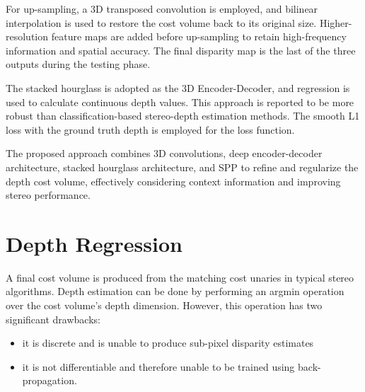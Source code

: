 \documentclass[english, LaM, oneside]{sapthesis}%
\begin{document}
For up-sampling, a 3D transposed convolution is employed, and bilinear interpolation is used to restore the cost volume back to its original size. Higher-resolution feature maps are added before up-sampling to retain high-frequency information and spatial accuracy. The final disparity map is the last of the three outputs during the testing phase.

The stacked hourglass is adopted as the 3D Encoder-Decoder, and regression is used to calculate continuous depth values. This approach is reported to be more robust than classification-based stereo-depth estimation methods. The smooth L1 loss with the ground truth depth is employed for the loss function.

The proposed approach combines 3D convolutions, deep encoder-decoder architecture, stacked hourglass architecture, and SPP to refine and regularize the depth cost volume, effectively considering context information and improving stereo performance\cite{c15,c16}.


\section{Depth Regression}


A final cost volume is produced from the matching cost unaries in typical stereo algorithms. Depth estimation can be done by performing an argmin operation over the cost volume's depth dimension. However, this operation has two significant drawbacks: 
\begin{itemize}
    \item it is discrete and is unable to produce sub-pixel disparity estimates
    \item  it is not differentiable and therefore unable to be
trained using back-propagation.
\end{itemize}
\end{document}
